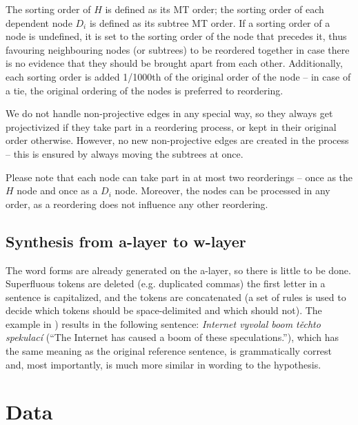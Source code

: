 The sorting order of $H$ is defined as its MT order; the sorting order of each 
dependent node $D_i$ is defined as its subtree MT order. If a sorting order of 
a node is undefined, it is set to the sorting order of the node that precedes 
it, thus favouring neighbouring nodes (or subtrees) to be reordered together in 
case there is no evidence that they should be brought apart from each other. 
Additionally, each sorting order is added 1/1000th of the original order of the 
node -- in case of a tie, the original ordering of the nodes is preferred to 
reordering.

We do not handle non-projective edges in any special way, so they always get 
projectivized if they take part in a reordering process, or kept in their 
original order otherwise. However, no new non-projective edges are created
in the process – this is ensured by always moving the subtrees at once.

Please note that each node can take part in at most two reorderings – once
as the $H$ node and once as a $D_i$ node. Moreover, the nodes can be processed 
in any order, as a reordering does not influence any other reordering.

\subsection{Synthesis from a-layer to w-layer}
The word forms are already generated on the a-layer, so there is little to be 
done. Superfluous tokens are deleted (e.g. duplicated commas)%
the first letter in a sentence is capitalized, and the tokens are 
concatenated (a set of rules is used to decide which tokens should be
space-delimited and which should not).
The example in ) results in the following sentence:
\textit{Internet vyvolal boom těchto spekulací} (``The Internet has caused a boom 
of these speculations.''), which has the same meaning as the original reference 
sentence, is grammatically correst and, most importantly, is much more similar in
wording to the hypothesis.


\section{Data}

